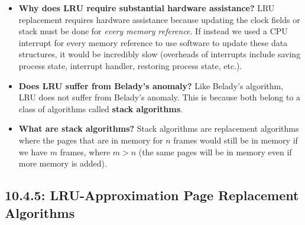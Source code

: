 \documentclass[12pt]{article}
\begin{document}
\begin{itemize}
\begin{itemize}
        \end{itemize}
    \item \textbf{Why does LRU require substantial hardware assistance?} LRU replacement requires hardware assistance because updating the clock fields or stack must be done for \textit{every memory reference}. If instead we used a CPU interrupt for every memory reference to use software to update these data structures, it would be incredibly slow (overheads of interrupts include saving process state, interrupt handler, restoring process state, etc.).
    \item \textbf{Does LRU suffer from Belady's anomaly?} Like Belady's algorithm, LRU does not suffer from Belady's anomaly. This is because both belong to a class of algorithms called \textbf{stack algorithms}.
    \item \textbf{What are stack algorithms?} Stack algorithms are replacement algorithms where the pages that are in memory for \(n\) frames would still be in memory if we have \(m\) frames, where \(m > n\) (the same pages will be in memory even if more memory is added).
\end{itemize}

\subsection*{10.4.5: LRU-Approximation Page Replacement Algorithms}
\end{document}
